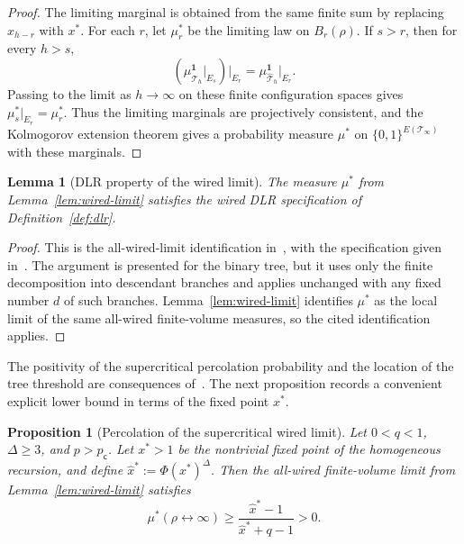 \documentclass[11pt]{amsart}
\theoremstyle{plain}
\newtheorem{lemma}[theorem]{Lemma}
\newtheorem{proposition}[theorem]{Proposition}
\theoremstyle{definition}
\theoremstyle{remark}
\newcommand{\dreg}{\widehat {\mathcal T}_h}
\newcommand{\pc}{p_{\mathsf{c}}}
\begin{document}
\begin{proof}
The limiting marginal is obtained from the same finite sum by replacing $x_{h-r}$ with $x^*$. For each $r$, let $\mu_r^*$ be the limiting law on $B_r(\rho)$. If $s>r$, then for every $h>s$,
\[
    \left(
        \mu_{\dreg}^{\mathbf 1}\vert_{E_s}
    \right)\vert_{E_r}
    =
    \mu_{\dreg}^{\mathbf 1}\vert_{E_r}.
\]
Passing to the limit as $h\to\infty$ on these finite configuration spaces gives $\mu_s^*\vert_{E_r}=\mu_r^*$. Thus the limiting marginals are projectively consistent, and the Kolmogorov extension theorem gives a probability measure $\mu^*$ on $\{0,1\}^{E(\mathcal T_\infty)}$ with these marginals.
\end{proof}

\begin{lemma}[DLR property of the wired limit]
\label{lem:wired-limit-dlr}
The measure $\mu^*$ from Lemma~\ref{lem:wired-limit} satisfies the wired DLR specification of Definition~\ref{def:dlr}.
\end{lemma}

\begin{proof}
This is the all-wired-limit identification in~\cite[Theorem~10.82(c)]{grimmett2006randomcluster}, with the specification given in~\cite[Equation~(10.66)]{grimmett2006randomcluster}. The argument is presented for the binary tree, but it uses only the finite decomposition into descendant branches and applies unchanged with any fixed number $d$ of such branches. Lemma~\ref{lem:wired-limit} identifies $\mu^*$ as the local limit of the same all-wired finite-volume measures, so the cited identification applies.
\end{proof}

The positivity of the supercritical percolation probability and the location of the tree threshold are consequences of~\cite[Proposition~10.81 and Theorem~10.82(a),(b)]{grimmett2006randomcluster}. The next proposition records a convenient explicit lower bound in terms of the fixed point $x^*$.

\begin{proposition}[Percolation of the supercritical wired limit]
\label{prop:wired-limit-percolates}
Let $0<q<1$, $\Delta\ge3$, and $p>\pc$. Let $x^*>1$ be the nontrivial fixed point of the homogeneous recursion, and define $\widehat x^*:=\Phi(x^*)^\Delta$. Then the all-wired finite-volume limit from Lemma~\ref{lem:wired-limit} satisfies
\[
    \mu^*(\rho\leftrightarrow\infty)
    \ge
    \frac{\widehat x^*-1}{\widehat x^*+q-1}
    >0.
\]
\end{proposition}
\end{document}
